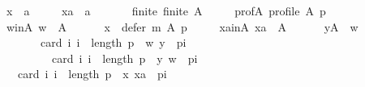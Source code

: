 \begin{isabellebody}
\ \ \ \ x\ {\isacharcolon}{\kern0pt}{\isacharcolon}{\kern0pt}\ {\isachardoublequoteopen}{\isacharprime}{\kern0pt}a{\isachardoublequoteclose}\ \isanewline
\ \ \ \ xa\ {\isacharcolon}{\kern0pt}{\isacharcolon}{\kern0pt}\ {\isachardoublequoteopen}{\isacharprime}{\kern0pt}a{\isachardoublequoteclose}\isanewline
\ \ \isamarkupfalse%
\isanewline
\ \ \ \ finite{\isacharcolon}{\kern0pt}\ {\isachardoublequoteopen}finite\ A{\isachardoublequoteclose}\ \isanewline
\ \ \ \ prof{\isacharunderscore}{\kern0pt}A{\isacharcolon}{\kern0pt}\ {\isachardoublequoteopen}profile\ A\ p{\isachardoublequoteclose}\ \isanewline
\ \ \ \ w{\isacharunderscore}{\kern0pt}in{\isacharunderscore}{\kern0pt}A{\isacharcolon}{\kern0pt}\ {\isachardoublequoteopen}w\ {\isasymin}\ A{\isachardoublequoteclose}\ \isanewline
\ \ \ \ {}{\isacharcolon}{\kern0pt}\ {\isachardoublequoteopen}x\ {\isasymin}\ defer\ m\ A\ p{\isachardoublequoteclose}\ \isanewline
\ \ \ \ xa{\isacharunderscore}{\kern0pt}in{\isacharunderscore}{\kern0pt}A{\isacharcolon}{\kern0pt}\ {\isachardoublequoteopen}xa\ {\isasymin}\ A{\isachardoublequoteclose}\ \isanewline
\ \ \ \ {}{\isacharcolon}{\kern0pt}\ {\isachardoublequoteopen}{\isasymforall}y{\isasymin}A\ {\isacharminus}{\kern0pt}\ {\isacharbraceleft}{\kern0pt}w{\isacharbraceright}{\kern0pt}{\isachardot}{\kern0pt}\isanewline
\ \ \ \ \ \ \ \ \ \ card\ {\isacharbraceleft}{\kern0pt}i{\isachardot}{\kern0pt}\ i\ {\isacharless}{\kern0pt}\ length\ p\ {\isasymand}\ {\isacharparenleft}{\kern0pt}w{\isacharcomma}{\kern0pt}\ y{\isacharparenright}{\kern0pt}\ {\isasymin}\ {\isacharparenleft}{\kern0pt}p{\isacharbang}{\kern0pt}i{\isacharparenright}{\kern0pt}{\isacharbraceright}{\kern0pt}\ {\isacharless}{\kern0pt}\isanewline
\ \ \ \ \ \ \ \ \ \ \ \ card\ {\isacharbraceleft}{\kern0pt}i{\isachardot}{\kern0pt}\ i\ {\isacharless}{\kern0pt}\ length\ p\ {\isasymand}\ {\isacharparenleft}{\kern0pt}y{\isacharcomma}{\kern0pt}\ w{\isacharparenright}{\kern0pt}\ {\isasymin}\ {\isacharparenleft}{\kern0pt}p{\isacharbang}{\kern0pt}i{\isacharparenright}{\kern0pt}{\isacharbraceright}{\kern0pt}{\isachardoublequoteclose}\ \isanewline
\ \ \ \ {}{\isacharcolon}{\kern0pt}\ {\isachardoublequoteopen}{\isasymnot}\ card\ {\isacharbraceleft}{\kern0pt}i{\isachardot}{\kern0pt}\ i\ {\isacharless}{\kern0pt}\ length\ p\ {\isasymand}\ {\isacharparenleft}{\kern0pt}x{\isacharcomma}{\kern0pt}\ xa{\isacharparenright}{\kern0pt}\ {\isasymin}\ {\isacharparenleft}{\kern0pt}p{\isacharbang}{\kern0pt}i{\isacharparenright}{\kern0pt}{\isacharbraceright}{\kern0pt}\ {\isacharless}{\kern0pt}\isanewline

\end{isabellebody}
